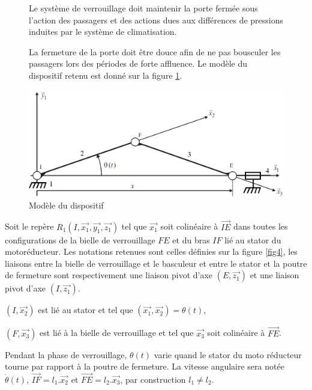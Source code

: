 \begin{figure}[!h]
\begin{minipage}{0.49\linewidth}
Le système de verrouillage doit maintenir la porte fermée sous l'action des passagers et des actions dues aux différences de pressions induites par le système de climatisation.

La fermeture de la porte doit être douce afin de ne pas bousculer les passagers lors des périodes de forte affluence. Le modèle du dispositif retenu est donné sur la figure \ref{fig12}.
\end{minipage}
\hfill
\begin{minipage}{0.49\linewidth}
 \centering\includegraphics[width=\linewidth]{img/Portes13.png}
 \caption{Modèle du dispositif}
 \label{fig12}
 \end{minipage}
\end{figure}

Soit le repère $R_1(I,\overrightarrow{x_1},\overrightarrow{y_1},\overrightarrow{z_1})$ tel que $\overrightarrow{x_1}$ soit colinéaire à $\overrightarrow{IE}$ dans toutes les configurations de la bielle de verrouillage $FE$ et du bras $IF$ lié au \og stator \fg du motoréducteur. Les notations retenues sont celles définies sur la figure \ref{fig4}, les liaisons entre la bielle de verrouillage et le basculeur et entre le stator et la poutre de fermeture sont respectivement une liaison pivot d'axe $(E,\overrightarrow{z_1})$ et une liaison pivot d'axe $(I,\overrightarrow{z_1})$.

$(I,\overrightarrow{x_2})$ est lié au stator et tel que $(\overrightarrow{x_1},\overrightarrow{x_2})=\theta(t)$,

$(F,\overrightarrow{x_3})$ est lié à la bielle de verrouillage et tel que $\overrightarrow{x_3}$ soit colinéaire à $\overrightarrow{FE}$.

Pendant la phase de verrouillage, $\theta(t)$ varie quand le stator du moto réducteur tourne par rapport à la poutre de fermeture. La vitesse angulaire sera notée $\dot{\theta}(t)$, $\overrightarrow{IF}=l_1.\overrightarrow{x_2}$ et $\overrightarrow{FE}=l_2.\overrightarrow{x_3}$, par construction $l_1\neq l_2$.


